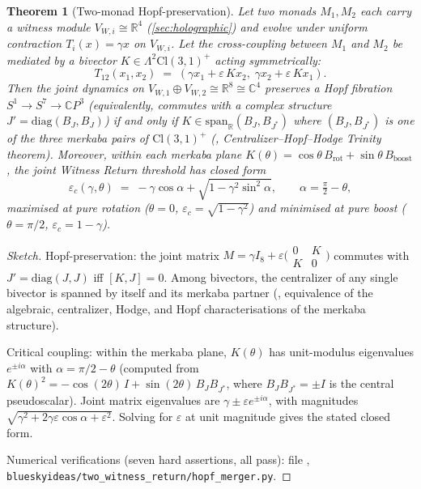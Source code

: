 \documentclass[11pt,a4paper]{article}
\theoremstyle{plain}
\newtheorem{theorem}{Theorem}[section]
\theoremstyle{definition}
\theoremstyle{remark}
\numberwithin{equation}{section}
\providecommand{\Cl}{\mathrm{Cl}}
\providecommand{\R}{\mathbb{R}}
\providecommand{\C}{\mathbb{C}}
\begin{document}
\begin{theorem}[Two-monad Hopf-preservation]
\label{thm:two-monad-hopf}
Let two monads $M_1, M_2$ each carry a witness module
$V_{W,i}\cong\R^4$ (\cref{sec:holographic}) and evolve under
uniform contraction $T_i(x)=\gamma x$ on $V_{W,i}$.
Let the cross-coupling between $M_1$ and $M_2$ be mediated by a
bivector $K\in\Lambda^2\Cl(3,1)^+$ acting symmetrically:
\[
  T_{12}(x_1, x_2) \;=\;
  (\gamma x_1 + \varepsilon\, K x_2,\;
   \gamma x_2 + \varepsilon\, K x_1).
\]
Then the joint dynamics on $V_{W,1}\oplus V_{W,2}\cong\R^8\cong
\C^4$ preserves a Hopf fibration $S^1\to S^7\to\C P^3$
(equivalently, commutes with a complex structure
$J' = \mathrm{diag}(B_J, B_J)$) \emph{if and only if}
$K\in\mathrm{span}_\R(B_J, B_{J^*})$ where $(B_J, B_{J^*})$ is
one of the three merkaba pairs of $\Cl(3,1)^+$
(\cite{paper-I-substrate}, Centralizer--Hopf--Hodge Trinity
theorem).  Moreover, within each
merkaba plane $K(\theta) = \cos\theta\, B_{\mathrm{rot}} +
\sin\theta\, B_{\mathrm{boost}}$, the joint Witness Return
threshold has closed form
\[
  \varepsilon_c(\gamma, \theta)
  \;=\; -\gamma\cos\alpha + \sqrt{1-\gamma^2\sin^2\alpha},
  \qquad \alpha = \tfrac{\pi}{2} - \theta,
\]
maximised at pure rotation ($\theta = 0$,
$\varepsilon_c = \sqrt{1-\gamma^2}$) and minimised at pure boost
($\theta = \pi/2$, $\varepsilon_c = 1-\gamma$).
\end{theorem}

\begin{proof}[Sketch]
Hopf-preservation: the joint matrix $M = \gamma I_8 +
\varepsilon\bigl(\begin{smallmatrix} 0 & K \\ K & 0
\end{smallmatrix}\bigr)$ commutes with $J' = \mathrm{diag}(J,J)$
iff $[K, J] = 0$.  Among bivectors, the centralizer of any single
bivector is spanned by itself and its merkaba partner
(\cite{paper-I-substrate}, equivalence of the algebraic,
centralizer, Hodge, and Hopf characterisations of the merkaba
structure).

Critical coupling: within the merkaba plane, $K(\theta)$ has
unit-modulus eigenvalues $e^{\pm i\alpha}$ with
$\alpha = \pi/2 - \theta$ (computed from
$K(\theta)^2 = -\cos(2\theta)\,I + \sin(2\theta)\,
B_J B_{J^*}$, where $B_J B_{J^*} = \pm I$ is the central
pseudoscalar).  Joint matrix eigenvalues are
$\gamma\pm\varepsilon e^{\pm i\alpha}$, with magnitudes
$\sqrt{\gamma^2 + 2\gamma\varepsilon\cos\alpha + \varepsilon^2}$.
Solving for $\varepsilon$ at unit magnitude gives the stated
closed form.

Numerical verifications (seven hard assertions, all pass): file
\cite{two-witness-return},
\texttt{blueskyideas/two\_witness\_return/hopf\_merger.py}.
\end{proof}
\end{document}
